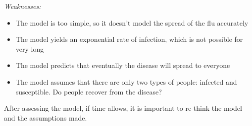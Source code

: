 \begin{example}
\emph{Weaknesses:}
\begin{itemize}
	\item The model is too simple, so it doesn't model the spread of the flu accurately
	\item The model yields an exponential rate of infection, which is not possible for very long
	\item The model predicts that eventually the disease will spread to everyone
	\item The model assumes that there are only two types of people: infected and susceptible. Do people recover from the disease?
\end{itemize}

\end{example}




After assessing the model, if time allows, it is important to re-think the model and the assumptions made.


